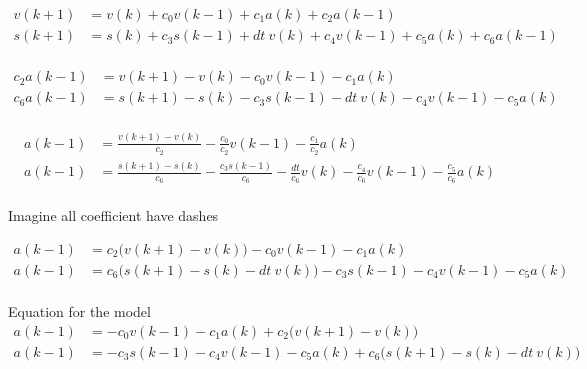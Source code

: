 \documentclass[10pt]{article}         %
\begin{document}
\begin{align}
v(k+1) &= v(k) + c_0 v(k-1) + c_1 a(k) + c_2 a(k-1) \\
s(k+1) &= s(k) + c_3 s(k-1) + dt \  v(k) + c_4v(k-1) + c_5 a(k) + c_6 a(k-1) \\
\end{align}



\begin{align}
c_2 a(k-1) &= v(k+1) - v(k) - c_0 v(k-1) - c_1 a(k)                           \\
c_6 a(k-1) &= s(k+1) - s(k) - c_3 s(k-1) - dt \  v(k) - c_4v(k-1) - c_5 a(k)  \\
\end{align}

\begin{align}
a(k-1) &= \frac {v(k+1) - v(k)} {c_2} - \frac{c_0}{c_2} v(k-1) -\frac{c_1}{c_2} a(k)                           \\
a(k-1) &= \frac{ s(k+1) - s(k) }{c_6}  - \frac{ c_3 s(k-1) }{c_6}  - \frac{dt}{c_6} v(k) - \frac{c_4}{c_6}v(k-1) - \frac{c_5}{c_6} a(k)  \\
\end{align}

Imagine all coefficient have dashes

\begin{align}
a(k-1) &= c_2 \bigl( v(k+1) - v(k) \bigr)  - c_0 v(k-1) - c_1 a(k)                          \\
a(k-1) &= c_6 \bigl( s(k+1) - s(k) - dt \  v(k) \bigr) - c_3 s(k-1) - c_4v(k-1) - c_5 a(k)  \\
\end{align}

Equation for the model 
\begin{align}
a(k-1) &=  - c_0 v(k-1) - c_1 a(k) + c_2 \bigl( v(k+1) - v(k) \bigr)                            \\
a(k-1) &= - c_3 s(k-1) - c_4v(k-1) - c_5 a(k)  + c_6 \bigl( s(k+1) - s(k) - dt \  v(k) \bigr)   \\
\end{align}
\end{document}

